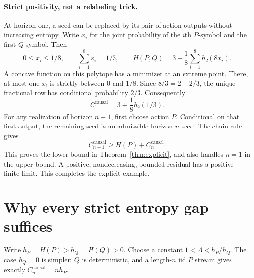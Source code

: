 \documentclass[11pt,a4paper]{article}
\newcommand{\cc}{C^{\mathrm{causal}}}
\begin{document}
\paragraph{Strict positivity, not a relabeling trick.}
At horizon one, a seed can be replaced by its pair of action outputs
without increasing entropy. Write $x_i$ for the joint probability of
the $i$th $P$-symbol and the first $Q$-symbol. Then
\[
0\le x_i\le1/8,\qquad \sum_{i=1}^8x_i=1/3,\qquad
H(P,Q)=3+\frac18\sum_{i=1}^8h_2(8x_i).
\]
A concave function on this polytope has a minimizer at an extreme point.
There, at most one $x_i$ is strictly between $0$ and $1/8$.
Since $8/3=2+2/3$, the unique fractional row has conditional probability
$2/3$. Consequently
\[
\cc_1=3+\frac18h_2(1/3).
\]
For any realization of horizon $n+1$, first choose action $P$. Conditional
on that first output, the remaining seed is an admissible horizon-$n$
seed. The chain rule gives
\begin{equation}\label{eq:monotone}
\cc_{n+1}\ge H(P)+\cc_n.
\end{equation}
This proves the lower bound in Theorem~\ref{thm:explicit}, and also handles
$n=1$ in the upper bound. A positive, nondecreasing, bounded residual has
a positive finite limit. This completes the explicit example.

\section{Why every strict entropy gap suffices}
Write $h_P=H(P)>h_Q=H(Q)>0$. Choose a constant
$1<\Lambda<h_P/h_Q$. The case $h_Q=0$ is simpler: $Q$ is deterministic,
and a length-$n$ iid $P$ stream gives exactly $\cc_n=nh_P$.
\end{document}
